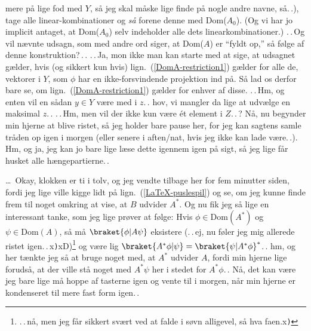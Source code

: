 \documentclass{report}
\begin{document}
mere på lige fod med $Y$, så jeg skal måske lige finde på nogle andre navne, så.\,.), tage alle linear-kombinationer og \emph{så} forene denne med Dom($A_0$). (Og vi har jo implicit antaget, at Dom($A_0$) selv indeholder alle dets linearkombinationer.) .\,.\,Og vil nævnte udsagn, som med andre ord siger, at Dom($A$) er ``fyldt op,'' så følge af denne konstruktion?\,.\,. .\,.\,Ja, mon ikke man kan starte med at sige, at udsagnet gælder, hvis (og sikkert kun hvis) lign.\ (\ref{DomA-restriction1}) gælder for alle de, vektorer i $Y$, som $\phi$ har en ikke-forsvindende projektion ind på. Så lad os derfor bare se, om lign.\ (\ref{DomA-restriction1}) gælder for enhver af disse. .\,.\,Hm, og enten vil en sådan $y\in Y$ være med i $z$.\,. hov, vi mangler da lige at udvælge en maksimal $z$.\,. .\,.\,Hm, men vil der ikke kun være ét element i $Z$.\,.\,? Nå, nu begynder min hjerne at blive ristet, så jeg holder bare pause her, for jeg kan sagtens samle tråden op igen i morgen (eller senere i aften/nat, hvis jeg ikke kan lade være.\,.). Hm, og ja, jeg kan jo bare lige læse dette igennem igen på sigt, så jeg lige får husket alle hængepartierne.\,.  

\ldots\ Okay, klokken er ti i tolv, og jeg vendte tilbage her for fem minutter siden, fordi jeg lige ville kigge lidt på lign.\ (\ref{LaTeX-puslespil}) og se, om jeg kunne finde frem til noget omkring at vise, at $B$ udvider $A^*$. Og nu fik jeg så lige en interessant tanke, som jeg lige prøver at følge: Hvis $\phi\in\mathrm{Dom}(A^*)$ og $\psi\in\mathrm{Dom}(A)$, så må $\braket{\phi | A \psi}$ eksistere (.\,.\,ej, nu føler jeg mig allerede ristet igen.\,.\,x\texttt)xD)\footnote{.\,.\,nå, men jeg får sikkert svært ved at falde i søvn alligevel, så hva faen.x\texttt{)}} og være lig $\braket{A^* \phi | \psi}=\braket{\psi | A^* \phi}^*$.\,. hm, og her tænkte jeg så at bruge noget med, at $A^*$ udvider $A$, fordi min hjerne lige forudså, at der ville stå noget med $A^*\psi$ her i stedet for $A^* \phi$.\,. Nå, det kan være jeg bare lige må hoppe af tasterne igen og vente til i morgen, når min hjerne er kondenseret til mere fast form igen.\,. 
\end{document}
